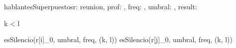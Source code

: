 \documentclass{article}
\begin{document}
\begin{proc}{hablantesSuperpuestos}{\In r: reunion,
    \In prof: \ent,
    \In freq: \ent,
    \In umbral: \ent,
    \Out result: \bool}{}
\end{proc}

{

    \implicaLuego

         \wedge k < l \implicaLuego

        \neg esSilencio(r[i]_{0},  umbral, freq, (k, l)) \wedge
        esSilencio(r[j]_{0}, umbral, freq, (k, l))
}
\end{document}

